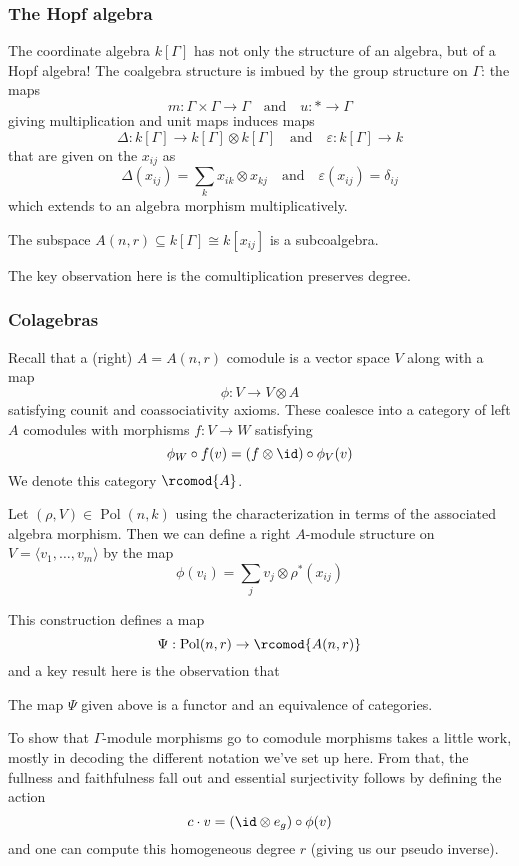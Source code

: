 \documentclass[12pt]{article}
\DeclareMathOperator{\Pol}{Pol}
\begin{document}
		\subsubsection{The Hopf algebra}
		The coordinate algebra $k[\Gamma]$ has not only the structure of an algebra, but of a Hopf algebra!
		The coalgebra structure is imbued by the group structure on $\Gamma$: the maps 
		\[m:\Gamma\times\Gamma\to \Gamma\quad\text{and}\quad u:\ast\to \Gamma\]
		giving multiplication and unit maps induces maps 
		\[\Delta:k[\Gamma]\to k[\Gamma]\otimes k[\Gamma]\quad\text{and}\quad \varepsilon:k[\Gamma]\to k\]
		that are given on the $x_{ij}$ as 
		\[\Delta(x_{ij})=\sum_k x_{ik}\otimes x_{kj}\quad\text{and}\quad \varepsilon(x_{ij})=\delta_{ij}\]
		which extends to an algebra morphism multiplicatively.

		\begin{thm}
			The subspace $A(n,r)\subseteq k[\Gamma]\cong k[x_{ij}]$ is a subcoalgebra.
		\end{thm}
		The key observation here is the comultiplication preserves degree.

		\subsubsection{Colagebras}
		Recall that a (right) $A=A(n,r)$ comodule is a vector space $V$ along with a map 
		\[\phi:V\to V\otimes A\]
		satisfying counit and coassociativity axioms. These coalesce into a category of left $A$ comodules with morphisms 
		$f:V\to W$ satisfying 
		\[\phi_W\circ f(v)=(f\otimes \id)\circ \phi_V(v)\]
		We denote this category $\rcomod{A}$.

		Let $(\rho,V)\in \Pol(n,k)$ using the characterization in terms of the associated algebra morphism. Then 
		we can define a right $A$-module structure on $V=\langle v_1,\dots,v_m\rangle$ by the map 
		\[\phi(v_i)=\sum_jv_j\otimes \rho^\ast(x_{ij})\] 
		
		This construction defines a map
		\[\Psi:\Pol(n,r)\to \rcomod{A(n,r)}\] 
		and a key result here is the observation that 
		\begin{thm}
			The map $\Psi$ given above is a functor and an equivalence of categories.
		\end{thm}
		\begin{rmk}
			To show that $\Gamma$-module morphisms go to comodule morphisms takes a little work, mostly in decoding 
			the different notation we've set up here. From that, the fullness and faithfulness fall out and essential surjectivity 
			follows by defining the action 
			\[c\cdot v =(\id\otimes e_g)\circ\phi(v)\]
			and one can compute this homogeneous degree $r$ (giving us our pseudo inverse).
		\end{rmk}
\end{document}
